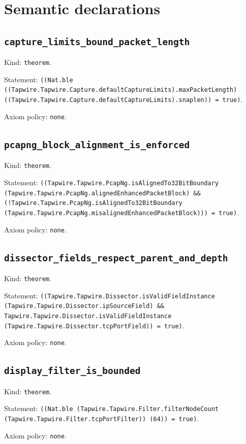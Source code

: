 \documentclass[11pt]{article}
\begin{document}
\section*{Semantic declarations}
\subsection*{\texttt{capture\_limits\_bound\_packet\_length}}
\noindent Kind: \texttt{theorem}.\par
\noindent Statement: \texttt{((Nat.ble ((Tapwire.Tapwire.Capture.defaultCaptureLimits).maxPacketLength) ((Tapwire.Tapwire.Capture.defaultCaptureLimits).snaplen)) = true)}.\par
\noindent Axiom policy: \texttt{none}.\par
\subsection*{\texttt{pcapng\_block\_alignment\_is\_enforced}}
\noindent Kind: \texttt{theorem}.\par
\noindent Statement: \texttt{((Tapwire.Tapwire.PcapNg.isAlignedTo32BitBoundary (Tapwire.Tapwire.PcapNg.alignedEnhancedPacketBlock) \&\& (!Tapwire.Tapwire.PcapNg.isAlignedTo32BitBoundary (Tapwire.Tapwire.PcapNg.misalignedEnhancedPacketBlock))) = true)}.\par
\noindent Axiom policy: \texttt{none}.\par
\subsection*{\texttt{dissector\_fields\_respect\_parent\_and\_depth}}
\noindent Kind: \texttt{theorem}.\par
\noindent Statement: \texttt{((Tapwire.Tapwire.Dissector.isValidFieldInstance (Tapwire.Tapwire.Dissector.ipSourceField) \&\& Tapwire.Tapwire.Dissector.isValidFieldInstance (Tapwire.Tapwire.Dissector.tcpPortField)) = true)}.\par
\noindent Axiom policy: \texttt{none}.\par
\subsection*{\texttt{display\_filter\_is\_bounded}}
\noindent Kind: \texttt{theorem}.\par
\noindent Statement: \texttt{((Nat.ble (Tapwire.Tapwire.Filter.filterNodeCount (Tapwire.Tapwire.Filter.tcpPortFilter)) (64)) = true)}.\par
\noindent Axiom policy: \texttt{none}.\par
\end{document}
